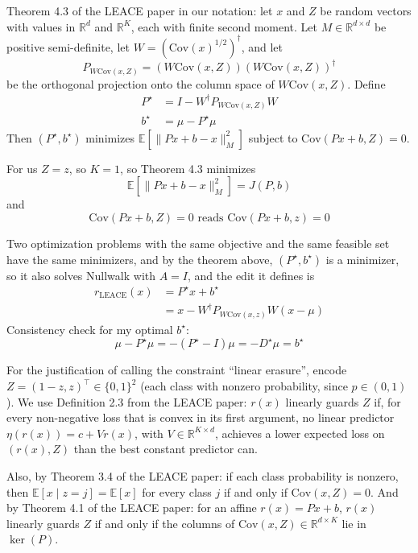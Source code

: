 \documentclass[10pt,a4paper,twocolumn]{article}
\newcommand{\R}{\mathbb{R}}
\begin{document}
	Theorem 4.3 of the LEACE paper in our notation: let $x$ and $Z$ be random vectors with values in $\R^d$ and $\R^K$, each with finite second moment. Let $M \in \R^{d \times d}$ be positive semi-definite, let $W = \left( \mathrm{Cov}(x)^{1/2} \right)^\dagger$, and let
	$$P_{W \mathrm{Cov}(x, Z)} = \left( W \mathrm{Cov}(x, Z) \right) \left( W \mathrm{Cov}(x, Z) \right)^\dagger$$
	be the orthogonal projection onto the column space of $W \mathrm{Cov}(x, Z)$. Define
	$$\begin{aligned}
		P^\star & = I - W^\dagger P_{W \mathrm{Cov}(x, Z)} W \\
		b^\star & = \mu - P^\star \mu
	\end{aligned}$$
	Then $(P^\star, b^\star)$ minimizes $\mathbb{E} \left[ \| P x + b - x \|_M^2 \right]$ subject to $\mathrm{Cov}(P x + b, Z) = 0$.

	For us $Z = z$, so $K = 1$, so Theorem 4.3 minimizes
	$$\mathbb{E} \left[ \| P x + b - x \|_M^2 \right] = J(P, b)$$
	and
	$$\mathrm{Cov}(P x + b, Z) = 0 \text{ reads } \mathrm{Cov}(P x + b, z) = 0$$

	Two optimization problems with the same objective and the same feasible set have the same minimizers, and by the theorem above, $(P^\star, b^\star)$ is a minimizer, so it also solves Nullwalk with $A = I$, and the edit it defines is
	$$\begin{aligned}
		r_{\mathrm{LEACE}}(x) & = P^\star x + b^\star \\
		& = x - W^\dagger P_{W \mathrm{Cov}(x, z)} W (x - \mu)
	\end{aligned}$$
	Consistency check for my optimal $b^\star$:
	$$\mu - P^\star \mu = - (P^\star - I) \mu = - D^\star \mu = b^\star$$

	For the justification of calling the constraint ``linear erasure'', encode $Z = (1 - z, z)^\top \in \{0, 1\}^2$ (each class with nonzero probability, since $p \in (0, 1)$). We use Definition 2.3 from the LEACE paper: $r(x)$ linearly guards $Z$ if, for every non-negative loss that is convex in its first argument, no linear predictor $\eta(r(x)) = c + V r(x)$, with $V \in \R^{K \times d}$, achieves a lower expected loss on $(r(x), Z)$ than the best constant predictor can.

	Also, by Theorem 3.4 of the LEACE paper: if each class probability is nonzero, then $\mathbb{E}[x \mid z = j] = \mathbb{E}[x]$ for every class $j$ if and only if $\mathrm{Cov}(x, Z) = 0$. And by Theorem 4.1 of the LEACE paper: for an affine $r(x) = P x + b$, $r(x)$ linearly guards $Z$ if and only if the columns of $\mathrm{Cov}(x, Z) \in \R^{d \times K}$ lie in $\ker(P)$.
\end{document}
